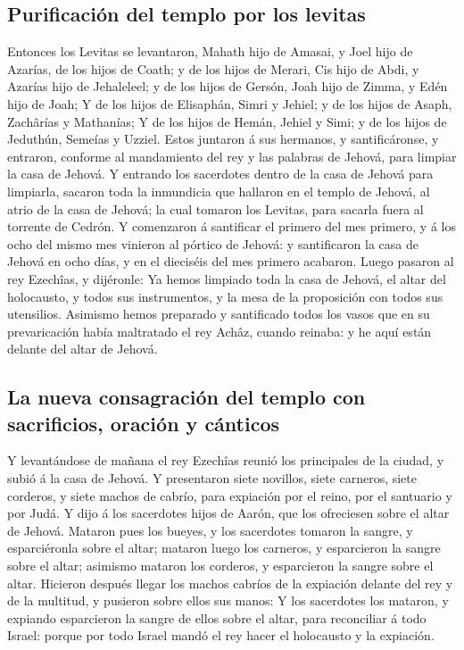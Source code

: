 \hypertarget{purificaciuxf3n-del-templo-por-los-levitas}{%
\subsection{Purificación del templo por los
levitas}\label{purificaciuxf3n-del-templo-por-los-levitas}}

 Entonces los Levitas se levantaron, Mahath hijo de Amasai,
y Joel hijo de Azarías, de los hijos de Coath; y de los hijos de Merari,
Cis hijo de Abdi, y Azarías hijo de Jehaleleel; y de los hijos de
Gersón, Joah hijo de Zimma, y Edén hijo de Joah;  Y de los
hijos de Elisaphán, Simri y Jehiel; y de los hijos de Asaph, Zachârías y
Mathanías;  Y de los hijos de Hemán, Jehiel y Simi; y de
los hijos de Jeduthún, Semeías y Uzziel.  Estos juntaron á
sus hermanos, y santificáronse, y entraron, conforme al mandamiento del
rey y las palabras de Jehová, para limpiar la casa de Jehová.
 Y entrando los sacerdotes dentro de la casa de Jehová para
limpiarla, sacaron toda la inmundicia que hallaron en el templo de
Jehová, al atrio de la casa de Jehová; la cual tomaron los Levitas, para
sacarla fuera al torrente de Cedrón.  Y comenzaron á
santificar el primero del mes primero, y á los ocho del mismo mes
vinieron al pórtico de Jehová: y santificaron la casa de Jehová en ocho
días, y en el dieciséis del mes primero acabaron.  Luego
pasaron al rey Ezechîas, y dijéronle: Ya hemos limpiado toda la casa de
Jehová, el altar del holocausto, y todos sus instrumentos, y la mesa de
la proposición con todos sus utensilios.  Asimismo hemos
preparado y santificado todos los vasos que en su prevaricación había
maltratado el rey Achâz, cuando reinaba: y he aquí están delante del
altar de Jehová.

\hypertarget{la-nueva-consagraciuxf3n-del-templo-con-sacrificios-oraciuxf3n-y-cuxe1nticos}{%
\subsection{La nueva consagración del templo con sacrificios, oración y
cánticos}\label{la-nueva-consagraciuxf3n-del-templo-con-sacrificios-oraciuxf3n-y-cuxe1nticos}}

 Y levantándose de mañana el rey Ezechîas reunió los
principales de la ciudad, y subió á la casa de Jehová.  Y
presentaron siete novillos, siete carneros, siete corderos, y siete
machos de cabrío, para expiación por el reino, por el santuario y por
Judá. Y dijo á los sacerdotes hijos de Aarón, que los ofreciesen sobre
el altar de Jehová.  Mataron pues los bueyes, y los
sacerdotes tomaron la sangre, y esparciéronla sobre el altar; mataron
luego los carneros, y esparcieron la sangre sobre el altar; asimismo
mataron los corderos, y esparcieron la sangre sobre el altar.
 Hicieron después llegar los machos cabríos de la expiación
delante del rey y de la multitud, y pusieron sobre ellos sus manos:
 Y los sacerdotes los mataron, y expiando esparcieron la
sangre de ellos sobre el altar, para reconciliar á todo Israel: porque
por todo Israel mandó el rey hacer el holocausto y la expiación.

